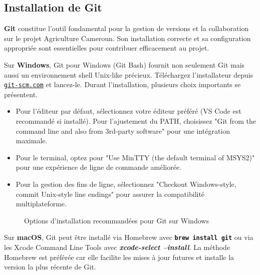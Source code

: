 \subsection{Installation de Git}

\textbf{Git} constitue l'outil fondamental pour la gestion de versions et la collaboration sur le projet Agriculture Cameroun. Son installation correcte et sa configuration appropriée sont essentielles pour contribuer efficacement au projet.

Sur \textbf{Windows}, Git pour Windows (Git Bash) fournit non seulement Git mais aussi un environnement shell Unix-like précieux. Téléchargez l'installateur depuis \texttt{\href{https://git-scm.com/download/win}{git-scm.com}} et lancez-le. Durant l'installation, plusieurs choix importants se présentent. 
\begin{itemize}
    \item Pour l'éditeur par défaut, sélectionnez votre éditeur préféré (VS Code est recommandé si installé). Pour l'ajustement du PATH, choisissez "Git from the command line and also from 3rd-party software" pour une intégration maximale.
    \item Pour le terminal, optez pour "Use MinTTY (the default terminal of MSYS2)" pour une expérience de ligne de commande améliorée.
    \item Pour la gestion des fins de ligne, sélectionnez "Checkout Windows-style, commit Unix-style line endings" pour assurer la compatibilité multiplateforme.
\end{itemize}

\begin{figure}[H]
\centering
{}
\caption{Options d'installation recommandées pour Git sur Windows}
\end{figure}

Sur \textbf{macOS}, Git peut être installé via Homebrew avec \texttt{\textbf{brew install git}} ou via les Xcode Command Line Tools avec \textbf{\textit{xcode-select --install}}. La méthode Homebrew est préférée car elle facilite les mises à jour futures et installe la version la plus récente de Git.

